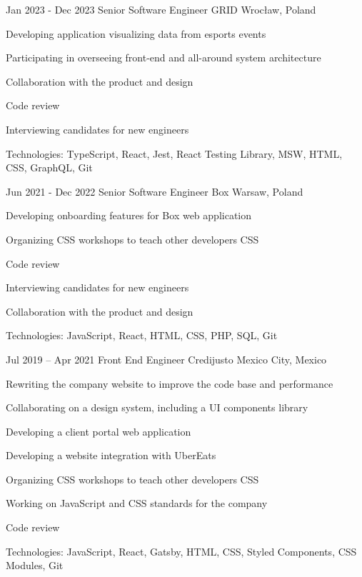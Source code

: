 \begin{sectionlist}
    \sectionlistitemjob
        {Jan 2023 - Dec 2023}
        {Senior Software Engineer}
        {GRID}
        {Wrocław, Poland}
        {
            \begin{joblisting}
                \item Developing application visualizing data from esports events
                \item Participating in overseeing front-end and all-around system architecture
                \item Collaboration with the product and design
                \item Code review
                \item Interviewing candidates for new engineers
                \item Technologies: TypeScript, React, Jest, React Testing Library, MSW, HTML, CSS, GraphQL, Git
            \end{joblisting}
        }

    \sectionlistitemjob
        {Jun 2021 - Dec 2022}
        {Senior Software Engineer}
        {Box}
        {Warsaw, Poland}
        {
            \begin{joblisting}
                \item Developing onboarding features for Box web application
                \item Organizing CSS workshops to teach other developers CSS
                \item Code review
                \item Interviewing candidates for new engineers
                \item Collaboration with the product and design
                \item Technologies: JavaScript, React, HTML, CSS, PHP, SQL, Git
            \end{joblisting}
        }

    \sectionlistitemjob
        {Jul 2019 -- Apr 2021}
        {Front End Engineer}
        {Credijusto}
        {Mexico City, Mexico}
        {
            \begin{joblisting}
                \item Rewriting the company website to improve the code base and
                    performance
                \item Collaborating on a design system, including a UI components library
                \item Developing a client portal web application
                \item Developing a website integration with UberEats
                \item Organizing CSS workshops to teach other developers CSS
                \item Working on JavaScript and CSS standards for the company
                \item Code review
                \item Technologies: JavaScript, React, Gatsby, HTML, CSS,
                    Styled Components, CSS Modules, Git
            \end{joblisting}
        }


\end{sectionlist}
